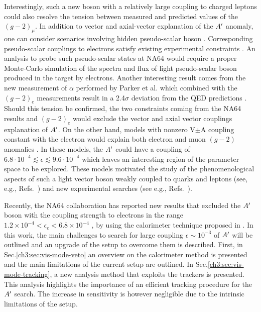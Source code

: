 Interestingly, such a new boson with a relatively large coupling to charged leptons could also resolve the tension between measured and predicted values of the $(g - 2)_{\mu}$. In addition to vector and axial-vector explanation of the $A'$ anomaly, one can consider scenarios involving hidden pseudo-scalar boson \cite{Ellwanger:2016wfe}. Corresponding pseudo-scalar couplings to electrons satisfy existing experimental constraints \cite{Andreas:2010ms,Adler:2004hp}. An analysis to probe such pseudo-scalar states at NA64 \cite{Kirpichnikov:2020tcf} would require a proper Monte-Carlo simulation of the spectra and flux of light pseudo-scalar boson produced in the target by electrons.
Another interesting result comes from the new measurement of $\alpha$ performed by Parker et al. \cite{Parker191} which combined with the $(g-2)_e$ measurements result in a 2.4$\sigma$ deviation from the QED predictions \cite{PhysRevLett.100.120801}. Should this tension be confirmed, the two constraints coming from the NA64 results and $(g - 2)_e$ would exclude the vector and axial vector couplings explanation of $A'$. On the other hand, models with nonzero V$\pm$A coupling constant with the electron would explain both electron and muon $(g - 2)$ anomalies \cite{Krasnikov:2019dgh}. In these models, the $A'$ could have a coupling of $6.8\cdot 10^{-4} \lesssim \epsilon \lesssim 9.6 \cdot 10^{-4}$ which leaves an interesting region of the parameter space to be explored.
These models motivated the study of the phenomenological aspects of such a light vector boson weakly coupled to quarks and leptons (see, e.g., Refs.~\cite{fayet1, fayet2, fayet3, fayet4,jk, cheng, Zhang:2017zap, ia, liang, bart}) 
and new experimental searches (see e.g., Refs.~\cite{mb, nardi}).

Recently, the NA64 collaboration has reported new results that excluded the $A'$ boson  with the coupling strength  to electrons in the range $1.2 \times 10^{-4} < \epsilon_e < 6.8 \times 10^{-4}$ \cite{Banerjee:2018vgk,Banerjee:2019hmi}, by using the calorimeter technique proposed in \cite{Gninenko:2013rka,Andreas:2013lya}. In this work, the main challenges to search for large coupling $\epsilon \sim 10^{-3}$ of $A'$ will be outlined and an upgrade of the setup to overcome them is described. First, in Sec.\ref{ch3:sec:vis-mode-veto} an overview on the calorimeter method \cite{Gninenko:2013rka,Andreas:2013lya,Banerjee:2019hmi} is presented and the main limitations of the current setup are outlined. In Sec.\ref{ch3:sec:vis-mode-tracking}, a new analysis method that exploits the trackers is presented. This analysis highlights the importance of an efficient tracking procedure for the $A'$ search. The increase in sensitivity is however negligible due to the intrinsic limitations of the setup.

